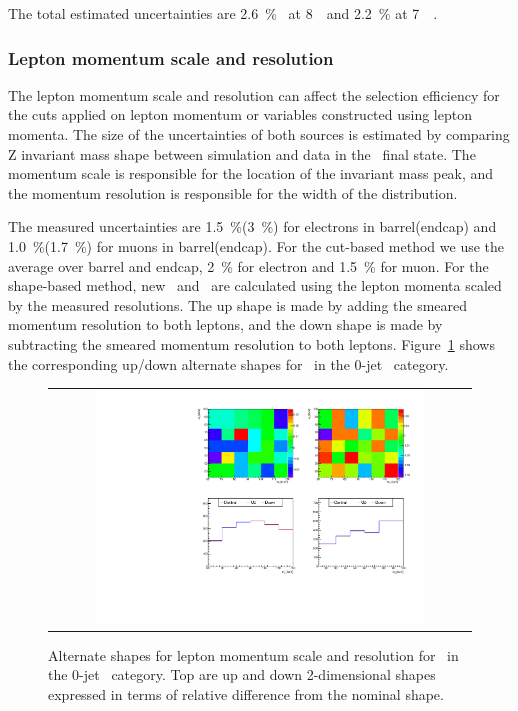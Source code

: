 The total estimated uncertainties are 2.6~\%~\cite{CMS-PAS-LUM-13-001} at 8~\TeV\ 
and 2.2~\% at 7~\TeV~\cite{Chatrchyan:2013oda}.  

\subsubsection{Lepton momentum scale and resolution}

The lepton momentum scale and resolution can affect the selection efficiency 
for the cuts applied on lepton momentum or variables constructed using 
lepton momenta. The size of the uncertainties of both sources is estimated 
by comparing Z invariant mass shape between simulation and data in the \SF\ 
final state. The momentum scale is responsible for the location of the 
invariant mass peak, and the momentum resolution is responsible for the width 
of the distribution. 

The measured uncertainties are 1.5~\%(3~\%) for electrons in barrel(endcap)  
and 1.0~\%(1.7~\%) for muons in barrel(endcap). For the cut-based method 
we use the average over barrel and endcap, 2~\% for electron and 1.5~\% for muon. 
For the shape-based method, new \mT\ and \mll\ are calculated using the 
lepton momenta scaled by the measured resolutions.
The up shape is made by adding the smeared momentum resolution to both leptons,
and the down shape is made by subtracting the smeared momentum resolution to both leptons.
Figure~\ref{fig:alter_lepres} shows the corresponding up/down alternate shapes 
for \qqww\ in the 0-jet \DF\ category. 
%
\begin{figure}[htp]
\centering
\begin{tabular}{c}
\includegraphics[width=0.8\textwidth]{figures/histo_qqWW_CMS_hww_MVALepResBounding_0j_zoom.pdf}
\end{tabular}
\caption{Alternate shapes for lepton momentum scale and resolution for \qqww\ in the 0-jet \DF\ category.
         Top are up and down 2-dimensional shapes expressed in terms of relative 
         difference from the nominal shape.}
\label{fig:alter_lepres}
\end{figure}


